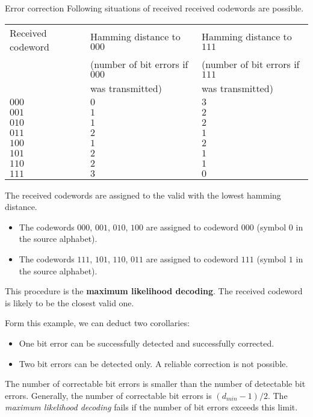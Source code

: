 \begin{refsection}
\begin{example}{Error correction}
	Following situations of received received codewords are possible.
	\begin{table}[H]
		\centering
		\begin{tabular}{|l||l||l|}
			\hline
			Received codeword & Hamming distance to $000$ & Hamming distance to $111$ \\
			 & (number of bit errors if $000$ & (number of bit errors if $111$ \\
			 & was transmitted) & was transmitted) \\
			\hline
			\hline
			$000$ & $0$ & $3$ \\
			\hline
			$001$ & $1$ & $2$ \\
			\hline
			$010$ & $1$ & $2$ \\
			\hline
			$011$ & $2$ & $1$ \\
			\hline
			$100$ & $1$ & $2$ \\
			\hline
			$101$ & $2$ & $1$ \\
			\hline
			$110$ & $2$ & $1$ \\
			\hline
			$111$ & $3$ & $0$ \\
			\hline
		\end{tabular}
	\end{table}
	The received codewords are assigned to the valid with the lowest hamming distance.
	\begin{itemize}
		\item The codewords $000$, $001$, $010$, $100$ are assigned to codeword $000$ (symbol $0$ in the source alphabet).
		\item The codewords $111$, $101$, $110$, $011$ are assigned to codeword $111$ (symbol $1$ in the source alphabet).
	\end{itemize}
	This procedure is the  \textbf{maximum likelihood decoding}. The received codeword is likely to be the closest valid one.
	
	Form this example, we can deduct two corollaries:
	\begin{itemize}
		\item One bit error can be successfully detected and successfully corrected.
		\item Two bit errors can be detected only. A reliable correction is not possible.
	\end{itemize}
\end{example}

The number of correctable bit errors is smaller than the number of detectable bit errors. Generally, the number of correctable bit errors is $(d_{min}-1)/2$. The \emph{maximum likelihood decoding} fails if the number of bit errors exceeds this limit.


\end{refsection}
